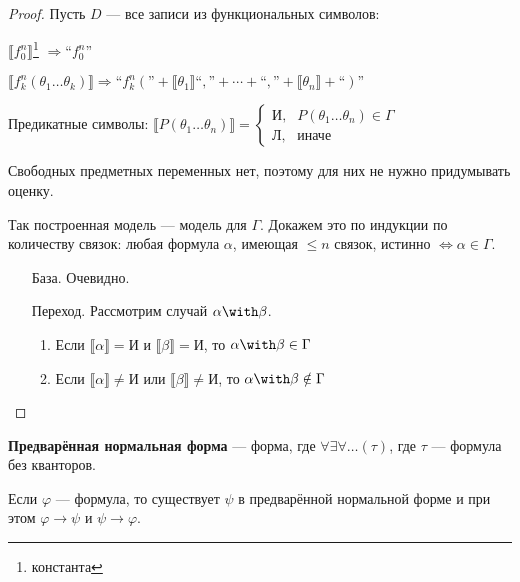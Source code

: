 \begin{proof}
    Пусть \(D\) --- все записи из функциональных символов:

    \(\llbracket f_0^n \rrbracket\)\footnote{константа} \( \Rightarrow \text{``}f_0^n\text{''}\)

    \(\llbracket f_k^n(\theta_1 \dots \theta_k) \rrbracket \Rightarrow \text{``}f_k^n(\text{''} + \llbracket \theta_1 \rrbracket \text{``},\text{''} + \cdots + \text{``},\text{''} + \llbracket \theta_n \rrbracket + \text{``})\text{''}\)

    Предикатные символы: \(\llbracket P(\theta_1 \dots \theta_n) \rrbracket = \begin{cases} \text{И}, & P(\theta_1 \dots \theta_n) \in \Gamma \\ \text{Л}, & \text{иначе} \end{cases} \)

    Свободных предметных переменных нет, поэтому для них не нужно придумывать оценку.

    Так построенная модель --- модель для \(\Gamma\). Докажем это по индукции по количеству связок: любая формула \(\alpha\), имеющая \( \leq n\) связок, истинно \(\Leftrightarrow \alpha \in \Gamma\).

    \begin{itemize}
        \item [База.] Очевидно.
        \item [Переход.] Рассмотрим случай \(\alpha \with \beta\).

              \begin{enumerate}
                  \item Если \(\llbracket \alpha \rrbracket = \text{И}\) и \(\llbracket \beta \rrbracket = \text{И}\), то \(\alpha \with \beta \in \Gamma\)
                  \item Если \(\llbracket \alpha \rrbracket \neq \text{И}\) или \(\llbracket \beta \rrbracket \neq \text{И}\), то \(\alpha \with \beta \notin \Gamma\)
              \end{enumerate}
    \end{itemize}
\end{proof}

\begin{definition}
    \textbf{Предварённая нормальная форма} --- форма, где \(\forall \exists \forall \dots (\tau)\), где \(\tau\) --- формула без кванторов.
\end{definition}
\begin{theorem}
    Если \(\varphi\) --- формула, то существует \(\psi\) в предварённой нормальной форме и при этом \(\varphi \to \psi\) и \(\psi \to \varphi\).
\end{theorem}

